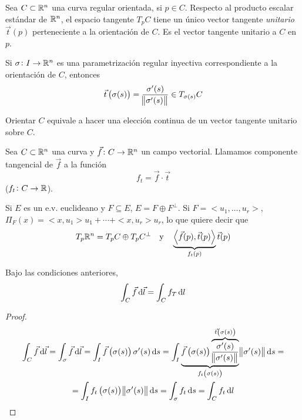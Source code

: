\begin{prop}
    Sea $C \subset \mathbb{R}^n$ una curva regular orientada, si $p \in C$. Respecto al producto escalar estándar de $\mathbb{R}^n$, el
    espacio tangente $T_pC$ tiene un único vector tangente \emph{unitario} $\vec{t}(p)$ perteneciente a la orientación de $C$. Es
    el vector tangente unitario a $C$ en $p$.

    Si $\sigma \colon I \to \mathbb{R}^n$ es una parametrización regular inyectiva correspondiente a la orientación de $C$, entonces
    \[
        \vec{t}\left( \sigma(s) \right) = \frac{\sigma^\prime(s)}{\norm{\sigma^\prime(s)}} \in T_{\sigma(s)}C
    \]
\end{prop}
\begin{obs*}
    Orientar $C$ equivale a hacer una elección continua de un vector tangente unitario sobre $C$.
\end{obs*}

\begin{defi}
    Sea $C \subset \mathbb{R}^n$ una curva y $\vec{f} \colon C \to \mathbb{R}^n$ un campo vectorial. Llamamos componente tangencial de $\vec{f}$ a
    la función
    \[
        f_t = \vec{f} \cdot \vec{t}
    \]
    ($f_t \colon C \to \mathbb{R}$).
\end{defi}

\begin{obs*}
    Si $E$ es un e.v. euclideano y $F \subseteq E$, $E = F \oplus F^\perp$. Si $F = <u_1, \dots, u_r>$, $\Pi_F(x) = <x,u_1>u_1 + \cdots + <x,u_r>u_r$, lo
    que quiere decir que
    \[
        T_p\mathbb{R}^n = T_pC \oplus T_pC^\perp \quad \text{y} \quad \underbrace{\left< \vec{f}(p), \vec{t}(p) \right>}_{f_t(p)}\vec{t}(p)
    \]
\end{obs*}

\begin{prop}
    Bajo las condiciones anteriores,
    \[
        \int_C \vec{f} \dif \vec{l} = \int_C f_T \dif l
    \]
\end{prop}

\begin{proof}
    \begin{gather*}
        \int_C \vec{f} \dif \vec{l} = \int_\sigma \vec{f} \dif \vec{l} = \int_I \vec{f}\left( \sigma(s) \right)\sigma^\prime(s) \dif s =
        \int_I \underbrace{\vec{f}\left( \sigma(s) \right) \overbrace{\frac{\sigma^\prime(s)}{\norm{\sigma^\prime(s)}}}^{\vec{t}\left( \sigma(s) \right)}}_
        {f_t\left( \sigma(s) \right)} \norm{\sigma^\prime(s)} \dif s = \\ = \int_I f_t\left( \sigma(s) \right) \norm{\sigma^\prime(s)} \dif s =
        \int_\sigma f_t \dif s = \int_C f_t \dif l
    \end{gather*}
\end{proof}

